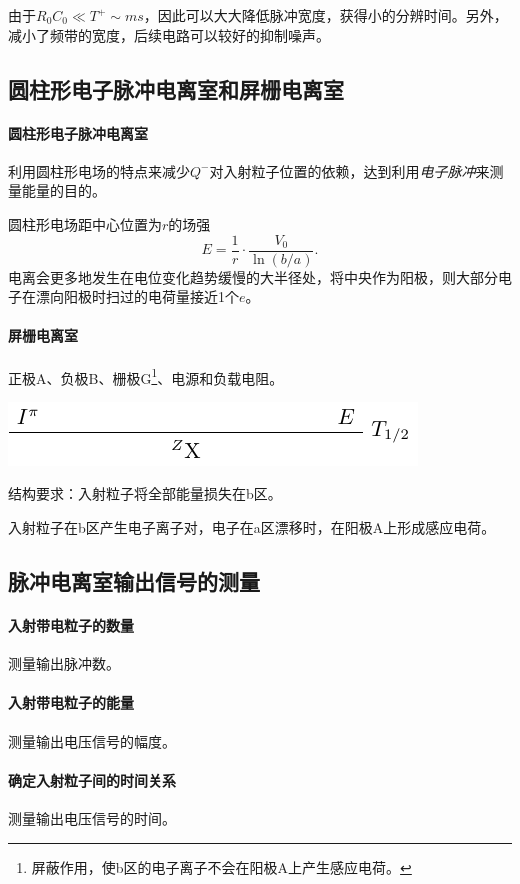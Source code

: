 由于$R_0C_0\ll T^+\sim\si{ms}$，因此可以大大降低脉冲宽度，获得小的分辨时间。另外，减小了频带的宽度，后续电路可以较好的抑制噪声。

\subsection{圆柱形电子脉冲电离室和屏栅电离室}

\paragraph{圆柱形电子脉冲电离室}
利用圆柱形电场的特点来减少$Q^-$对入射粒子位置的依赖，达到利用\textit{电子脉冲}来测量能量的目的。

圆柱形电场距中心位置为$r$的场强
\[
	E=\frac1r\cdot\frac{V_0}{\ln(b/a)}.
\]
电离会更多地发生在电位变化趋势缓慢的大半径处，将中央作为阳极，则大部分电子在漂向阳极时扫过的电荷量接近1个$e$。
\paragraph{屏栅电离室}
正极A、负极B、栅极G\footnote{屏蔽作用，使b区的电子离子不会在阳极A上产生感应电荷。}、电源和负载电阻。
\begin{center}
	\includegraphics[page=20]{figures/tikz/layouts.pdf}
\end{center}
结构要求：入射粒子将全部能量损失在b区。

入射粒子在b区产生电子离子对，电子在a区漂移时，在阳极A上形成感应电荷。

\subsection{脉冲电离室输出信号的测量}

\paragraph{入射带电粒子的数量}
测量输出脉冲数。
\paragraph{入射带电粒子的能量}
测量输出电压信号的幅度。
\paragraph{确定入射粒子间的时间关系}
测量输出电压信号的时间。

